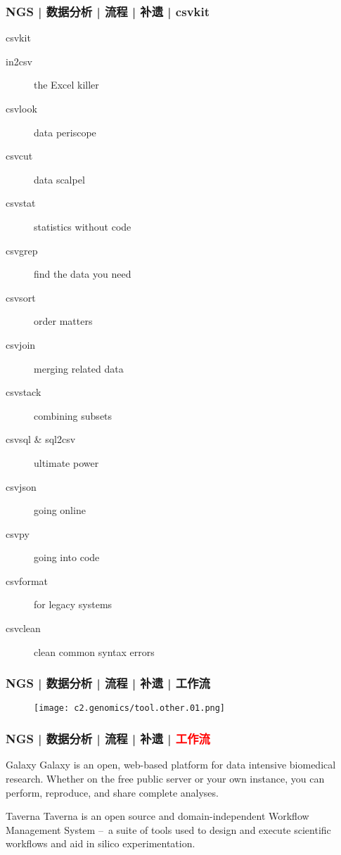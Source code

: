 \begin{frame}
  \frametitle{NGS | 数据分析 | 流程 | 补遗 | csvkit}
  \begin{block}{csvkit}
    \begin{description}
      \item[in2csv] the Excel killer
      \item[csvlook] data periscope
      \item[csvcut] data scalpel
      \item[csvstat] statistics without code
      \item[csvgrep] find the data you need
      \item[csvsort] order matters
      \item[csvjoin] merging related data
      \item[csvstack] combining subsets
      \item[csvsql \& sql2csv] ultimate power
      \item[csvjson] going online
      \item[csvpy] going into code
      \item[csvformat] for legacy systems
      \item[csvclean] clean common syntax errors
    \end{description}
  \end{block}
\end{frame}

\begin{frame}
  \frametitle{NGS | 数据分析 | 流程 | 补遗 | 工作流}
  \begin{figure}
    \centering
    \texttt{[image: c2.genomics/tool.other.01.png]}
  \end{figure}
\end{frame}

\begin{frame}
  \frametitle{NGS | 数据分析 | 流程 | 补遗 | \textcolor{red}{工作流}}
  \begin{block}{Galaxy}
    Galaxy is an open, web-based platform for data intensive biomedical research. Whether on the free public server or your own instance, you can perform, reproduce, and share complete analyses.
  \end{block}
  \pause
  \begin{block}{Taverna}
    Taverna is an open source and domain-independent Workflow Management System –\ a suite of tools used to design and execute scientific workflows and aid in silico experimentation.
  \end{block}
\end{frame}

